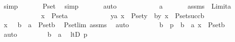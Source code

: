 \begin{isabellebody}
\ simp\ \isanewline
\ \ \ \ \isamarkupfalse%
\ P{\isacharunderscore}{\kern0pt}set{\isacharunderscore}{\kern0pt}{}\ \isamarkupfalse%
\ simp\ \isanewline
\ \ \ \ \isamarkupfalse%
\ auto\ \isanewline
\ \ \isamarkupfalse%
\ {\isacharminus}{\kern0pt}\ \isanewline
\ \ \ \ \isamarkupfalse%
\ a\ \isamarkupfalse%
\ \isanewline
\ \ \ \ assms\ {\isacharcolon}{\kern0pt}\ {\isachardoublequoteopen}Limit{\isacharparenleft}{\kern0pt}a{\isacharparenright}{\kern0pt}{\isachardoublequoteclose}\isanewline
\ \ \ \ \ \ \ \ \ \ \ \ {\isachardoublequoteopen}x\ {\isasymin}\ P{\isacharunderscore}{\kern0pt}set{\isacharparenleft}{\kern0pt}a{\isacharparenright}{\kern0pt}{\isachardoublequoteclose}\isanewline
\ \ \ \ \ \ \ \ \ \ \ \ {\isachardoublequoteopen}{\isasymforall}y{\isasymin}a{\isachardot}{\kern0pt}\ x\ {\isasymin}\ P{\isacharunderscore}{\kern0pt}set{\isacharparenleft}{\kern0pt}y{\isacharparenright}{\kern0pt}\ {\isasymlongrightarrow}\ {\isacharparenleft}{\kern0pt}{\isasymexists}b{\isacharless}{\kern0pt}y{\isachardot}{\kern0pt}\ x\ {\isasymin}\ P{\isacharunderscore}{\kern0pt}set{\isacharparenleft}{\kern0pt}succ{\isacharparenleft}{\kern0pt}b{\isacharparenright}{\kern0pt}{\isacharparenright}{\kern0pt}{\isacharparenright}{\kern0pt}{\isachardoublequoteclose}\ \isanewline
\ \ \ \ \isamarkupfalse%
\ \isamarkupfalse%
\ {\isachardoublequoteopen}x\ {\isasymin}\ {\isacharparenleft}{\kern0pt}{\isasymUnion}\ b\ {\isacharless}{\kern0pt}\ a\ {\isachardot}{\kern0pt}\ P{\isacharunderscore}{\kern0pt}set{\isacharparenleft}{\kern0pt}b{\isacharparenright}{\kern0pt}{\isacharparenright}{\kern0pt}{\isachardoublequoteclose}\ \isamarkupfalse%
\ P{\isacharunderscore}{\kern0pt}set{\isacharunderscore}{\kern0pt}lim\ assms\ \isamarkupfalse%
\ auto\ \isanewline
\ \ \ \ \isamarkupfalse%
\ \isamarkupfalse%
\ b\ \ p{}\ {\isacharcolon}{\kern0pt}\ {\isachardoublequoteopen}b\ {\isacharless}{\kern0pt}\ a{\isachardoublequoteclose}\ {\isachardoublequoteopen}x\ {\isasymin}\ P{\isacharunderscore}{\kern0pt}set{\isacharparenleft}{\kern0pt}b{\isacharparenright}{\kern0pt}{\isachardoublequoteclose}\ \isamarkupfalse%
\ auto\ \isanewline
\ \ \ \ \isamarkupfalse%
\ \isamarkupfalse%
\ {\isachardoublequoteopen}b\ {\isasymin}\ a{\isachardoublequoteclose}\ \isamarkupfalse%
\ ltD\ p{}\ \isamarkupfalse%

\end{isabellebody}
